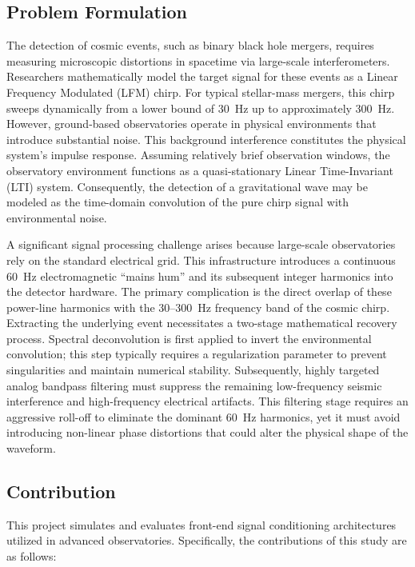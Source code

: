 \subsection{Problem Formulation}
The detection of cosmic events, such as binary black hole mergers, requires measuring microscopic distortions in spacetime via large-scale interferometers. Researchers mathematically model the target signal for these events as a Linear Frequency Modulated (LFM) chirp. For typical stellar-mass mergers, this chirp sweeps dynamically from a lower bound of 30~Hz up to approximately 300~Hz. However, ground-based observatories operate in physical environments that introduce substantial noise. This background interference constitutes the physical system's impulse response. Assuming relatively brief observation windows, the observatory environment functions as a quasi-stationary Linear Time-Invariant (LTI) system. Consequently, the detection of a gravitational wave may be modeled as the time-domain convolution of the pure chirp signal with environmental noise.

A significant signal processing challenge arises because large-scale observatories rely on the standard electrical grid. This infrastructure introduces a continuous 60~Hz electromagnetic ``mains hum'' and its subsequent integer harmonics into the detector hardware. The primary complication is the direct overlap of these power-line harmonics with the 30--300~Hz frequency band of the cosmic chirp. Extracting the underlying event necessitates a two-stage mathematical recovery process. Spectral deconvolution is first applied to invert the environmental convolution; this step typically requires a regularization parameter to prevent singularities and maintain numerical stability. Subsequently, highly targeted analog bandpass filtering must suppress the remaining low-frequency seismic interference and high-frequency electrical artifacts. This filtering stage requires an aggressive roll-off to eliminate the dominant 60~Hz harmonics, yet it must avoid introducing non-linear phase distortions that could alter the physical shape of the waveform.

\subsection{Contribution}
This project simulates and evaluates front-end signal conditioning architectures utilized in advanced observatories. Specifically, the contributions of this study are as follows:


